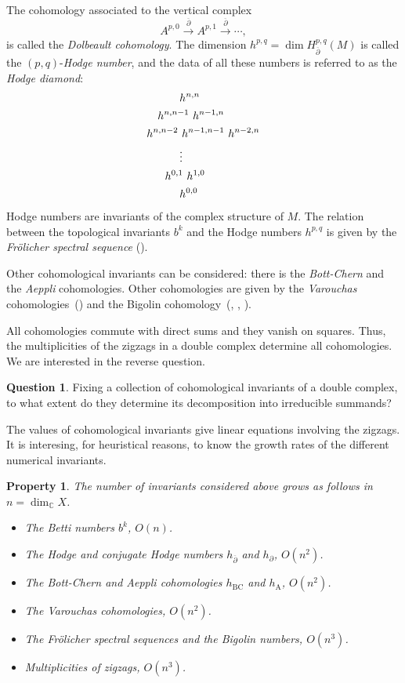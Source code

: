 \documentclass[leqno]{article}
\newtheorem{Property}[equation]{Property}
\theoremstyle{definition}
\newtheorem*{Question}{Question}
\numberwithin{equation}{section}
\begin{document}
The cohomology associated to the vertical complex
\[
A^{p, 0}
\xrightarrow{\overline{\partial}}
A^{p, 1}
\xrightarrow{\overline{\partial}}
\cdots ,
\]
is called the {\sl Dolbeault cohomology}. The dimension $h^{p, q} = \dim H_{\overline{\partial}}^{p, q}(M)$ is called the $(p, q)$-{\sl Hodge number}, and the data of all these numbers is referred to as the {\sl Hodge diamond}:
\[
\aligned
&\quad \quad \quad h^{n, n} \\
&\quad h^{n, n-1} \ h^{n-1, n} \\
&h^{n, n-2} \ h^{n-1, n-1} \ h^{n-2, n} \\
&\quad \quad \quad \vdots \\
&\quad \ \ h^{0, 1} \ h^{1, 0} \\
&\quad \quad \quad h^{0, 0}
\endaligned
\]
Hodge numbers are invariants of the complex structure of $M$. The relation between the topological invariants $b^k$ and the Hodge numbers $h^{p, q}$ is given by the {\sl Frölicher spectral sequence} (\cite{Fro}).

Other cohomological invariants can be considered: there is the {\sl Bott-Chern} and the {\sl Aeppli} cohomologies. Other cohomologies are given by the {\sl Varouchas} cohomologies~(\cite{JV}) and the Bigolin cohomology~(\cite{Sch}, \cite{Ste3}, \cite{Piovani}).

All cohomologies commute with direct sums and they vanish on squares. Thus, the multiplicities of the zigzags in a double complex determine all cohomologies. We are interested in the reverse question.

\begin{Question}
Fixing a collection of cohomological invariants of a double complex, to what extent do they determine its decomposition into irreducible summands?
\end{Question}

The values of cohomological invariants give linear equations involving the zigzags.
It is interesing, for heuristical reasons, to know the growth rates of the different numerical invariants.

\begin{Property}
The number of invariants considered above grows as follows in $n = \dim_{\mathbb{C}}X$.
\begin{itemize}
\item The Betti numbers $b^k$, $O(n)$.
\item The Hodge and conjugate Hodge numbers $h_{\overline{\partial}}$ and $h_{\partial}$, $O(n^2)$.
\item The Bott-Chern and Aeppli cohomologies $h_{\text{BC}}$ and $h_{\text{A}}$, $O(n^2)$.
\item The Varouchas cohomologies, $O(n^2)$.
\item The Frölicher spectral sequences and the Bigolin numbers, $O(n^3)$.
\item Multiplicities of zigzags, $O(n^3)$.
\end{itemize} 
\end{Property}
\end{document}
